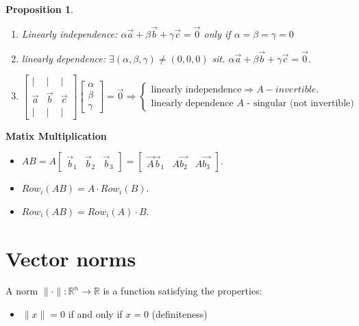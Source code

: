\documentclass[13pt]{article}
\newtheorem{proposition}[theorem]{Proposition}
\theoremstyle{definition}
\theoremstyle{remark}
\begin{document}
\begin{multicols}{2}
\begin{proposition}\hfill
\begin{enumerate}
    \item Linearly independence: $\alpha \vec{a}+\beta \vec{b}+\gamma \vec{c}=\overrightarrow{0}$ only if $\alpha=\beta=\gamma=0$
    \item linearly dependence: $\exists(\alpha, \beta, \gamma) \neq(0,0,0)$ sit. $\alpha \vec{a}+\beta \vec{b}+\gamma \vec{c}=\overrightarrow{0}$.
\item $\left[\begin{array}{lll}| & | & | \\ \vec{a} & \vec{b} & \vec{c}\\
| & | & | \end{array} \right]\left[\begin{array}{l}\alpha \\ \beta\\
\gamma\end{array}\right]=\vec{0} \Longrightarrow \begin{cases} \text{linearly independence} \Longrightarrow A-invertible.\\
\text{linearly dependence $A$ - singular (not invertible)}
\end{cases}$ 
\end{enumerate}

\end{proposition}

\textbf{Matix Multiplication}
\begin{itemize}
\item $A B=A\begin{bmatrix}\vec{b}_1 & \vec{b}_2 & \vec{b}_3
\end{bmatrix}=\begin{bmatrix}\vec{A} \vec{b}_1 & A \overrightarrow{b_2} & A \overrightarrow{b_3}\end{bmatrix}$.
\item $Row_i(AB)= A\cdot Row_i(B)$.
\item $Row_i(AB)= Row_i(A)\cdot B$.
\end{itemize}

\section{Vector norms}
A norm $\|\cdot\|: \mathbb{R}^{n} \rightarrow \mathbb{R}$ is a function satisfying the properties:

\begin{itemize}
  \item $\|x\|=0$ if and only if $x=0$ (definiteness)


\end{itemize}
\end{multicols}
\end{document}
